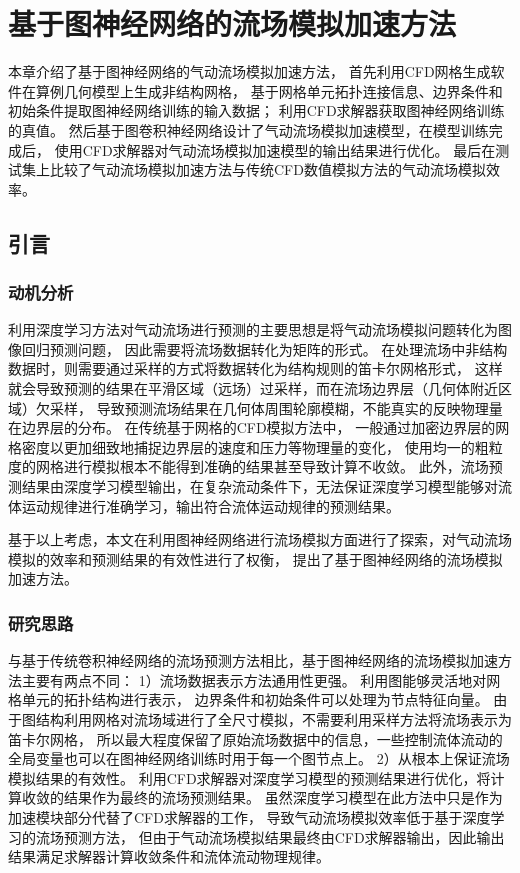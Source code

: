 \chapter{基于图神经网络的流场模拟加速方法}

本章介绍了基于图神经网络的气动流场模拟加速方法，
首先利用CFD网格生成软件在算例几何模型上生成非结构网格，
基于网格单元拓扑连接信息、边界条件和初始条件提取图神经网络训练的输入数据；
利用CFD求解器获取图神经网络训练的真值。
然后基于图卷积神经网络设计了气动流场模拟加速模型，在模型训练完成后，
使用CFD求解器对气动流场模拟加速模型的输出结果进行优化。
最后在测试集上比较了气动流场模拟加速方法与传统CFD数值模拟方法的气动流场模拟效率。

\section{引言}

\subsection{动机分析}

利用深度学习方法对气动流场进行预测的主要思想是将气动流场模拟问题转化为图像回归预测问题，
因此需要将流场数据转化为矩阵的形式。
在处理流场中非结构数据时，则需要通过采样的方式将数据转化为结构规则的笛卡尔网格形式，
这样就会导致预测的结果在平滑区域（远场）过采样，而在流场边界层（几何体附近区域）欠采样，
导致预测流场结果在几何体周围轮廓模糊，不能真实的反映物理量在边界层的分布。
在传统基于网格的CFD模拟方法中，
一般通过加密边界层的网格密度以更加细致地捕捉边界层的速度和压力等物理量的变化，
使用均一的粗粒度的网格进行模拟根本不能得到准确的结果甚至导致计算不收敛。
此外，流场预测结果由深度学习模型输出，在复杂流动条件下，无法保证深度学习模型能够对流体运动规律进行准确学习，输出符合流体运动规律的预测结果。

基于以上考虑，本文在利用图神经网络进行流场模拟方面进行了探索，对气动流场模拟的效率和预测结果的有效性进行了权衡，
提出了基于图神经网络的流场模拟加速方法。

\subsection{研究思路}
与基于传统卷积神经网络的流场预测方法相比，基于图神经网络的流场模拟加速方法主要有两点不同：
1）流场数据表示方法通用性更强。
利用图能够灵活地对网格单元的拓扑结构进行表示，
边界条件和初始条件可以处理为节点特征向量。
由于图结构利用网格对流场域进行了全尺寸模拟，不需要利用采样方法将流场表示为笛卡尔网格，
所以最大程度保留了原始流场数据中的信息，一些控制流体流动的全局变量也可以在图神经网络训练时用于每一个图节点上。
2）从根本上保证流场模拟结果的有效性。
利用CFD求解器对深度学习模型的预测结果进行优化，将计算收敛的结果作为最终的流场预测结果。
虽然深度学习模型在此方法中只是作为加速模块部分代替了CFD求解器的工作，
导致气动流场模拟效率低于基于深度学习的流场预测方法，
但由于气动流场模拟结果最终由CFD求解器输出，因此输出结果满足求解器计算收敛条件和流体流动物理规律。

